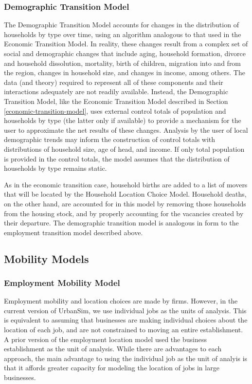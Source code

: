 \documentclass[fleqn]{article}
\begin{document}
\subsubsection{Demographic Transition Model}

The Demographic Transition Model accounts for changes in the
distribution of households by type over time, using an algorithm
analogous to that used in the Economic Transition Model.  In
reality, these changes result from a complex set of social and
demographic changes that include aging, household formation,
divorce and household dissolution, mortality, birth of children,
migration into and from the region, changes in household size, and
changes in income, among others.  The data (and theory) required
to represent all of these components and their interactions
adequately are not readily available.  Instead, the Demographic
Transition Model, like the Economic Transition Model described
in Section \ref{economic-transition-model},
uses external control totals of population and households
by type (the latter only if available) to provide a mechanism for
the user to approximate the net results of these changes. Analysis
by the user of local demographic trends may inform the
construction of control totals with distributions of household
size, age of head, and income.  If only total population is
provided in the control totals, the model assumes that the
distribution of households by type remains static.

As in the economic transition case, household births are added to
a list of movers that will be located by the Household Location
Choice Model.  Household deaths, on the other hand, are accounted
for in this model by removing those households from the housing
stock, and by properly accounting for the vacancies created by
their departure.  The demographic transition model is analogous in
form to the employment transition model described above.


\subsection{Mobility Models}
\subsubsection{Employment Mobility Model}

Employment mobility and location choices are made by firms.
However, in the current version of UrbanSim, we use individual
jobs as the units of analysis.  This is equivalent to assuming
that businesses are making individual choices about the location
of each job, and are not constrained to moving an entire
establishment.  A prior version of the employment location model
used the business establishment as the unit of analysis.  While
there are advantages to each approach, the main advantage to using
the individual job as the unit of analyis is that it affords greater
capacity for modeling the location of jobs in large businesses.
\end{document}
